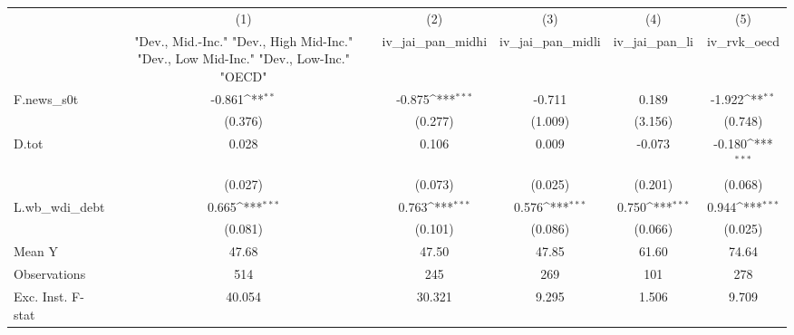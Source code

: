 {
\def\sym#1{\ifmmode^{#1}\else\(^{#1}\)\fi}
\begin{tabular}{l*{5}{c}}
\toprule
            &\multicolumn{1}{c}{(1)}&\multicolumn{1}{c}{(2)}&\multicolumn{1}{c}{(3)}&\multicolumn{1}{c}{(4)}&\multicolumn{1}{c}{(5)}\\
            &\multicolumn{1}{c}{ "Dev., Mid.-Inc." "Dev., High Mid-Inc." "Dev., Low Mid-Inc." "Dev., Low-Inc." "OECD" }&\multicolumn{1}{c}{iv\_jai\_pan\_midhi}&\multicolumn{1}{c}{iv\_jai\_pan\_midli}&\multicolumn{1}{c}{iv\_jai\_pan\_li}&\multicolumn{1}{c}{iv\_rvk\_oecd}\\
\midrule
F.news\_s0t  &      -0.861\sym{**} &      -0.875\sym{***}&      -0.711         &       0.189         &      -1.922\sym{**} \\
            &     (0.376)         &     (0.277)         &     (1.009)         &     (3.156)         &     (0.748)         \\
\addlinespace
D.tot       &       0.028         &       0.106         &       0.009         &      -0.073         &      -0.180\sym{***}\\
            &     (0.027)         &     (0.073)         &     (0.025)         &     (0.201)         &     (0.068)         \\
\addlinespace
L.wb\_wdi\_debt&       0.665\sym{***}&       0.763\sym{***}&       0.576\sym{***}&       0.750\sym{***}&       0.944\sym{***}\\
            &     (0.081)         &     (0.101)         &     (0.086)         &     (0.066)         &     (0.025)         \\
\midrule
Mean Y      &       47.68         &       47.50         &       47.85         &       61.60         &       74.64         \\
Observations&         514         &         245         &         269         &         101         &         278         \\
Exc. Inst. F-stat&      40.054         &      30.321         &       9.295         &       1.506         &       9.709         \\
\bottomrule
\end{tabular}
}
